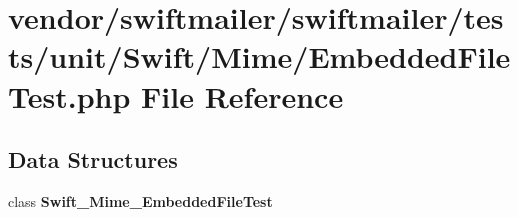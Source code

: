\section{vendor/swiftmailer/swiftmailer/tests/unit/\+Swift/\+Mime/\+Embedded\+File\+Test.php File Reference}
\label{_embedded_file_test_8php}
\subsection*{Data Structures}
\begin{DoxyCompactItemize}
\item 
class {\bf Swift\+\_\+\+Mime\+\_\+\+Embedded\+File\+Test}
\end{DoxyCompactItemize}
